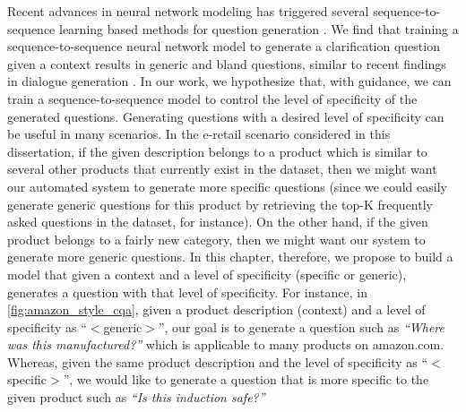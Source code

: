 \documentclass[11pt,a4paper]{article}
\begin{document}
Recent advances in neural network modeling has triggered several sequence-to-sequence learning \cite{sutskever2014sequence} based methods for question generation \cite{serban2016generating,duan2017question,du2017learning}. 
We find that training a sequence-to-sequence neural network model to generate a clarification question given a context results in generic and bland questions, similar to recent findings in dialogue generation \cite{li2016deep}.
In our work, we hypothesize that, with guidance, we can train a sequence-to-sequence model to control the level of specificity of the generated questions. 
Generating questions with a desired level of specificity can be useful in many scenarios.
In the e-retail scenario considered in this dissertation,  if the given description belongs to a product which is similar to several other products that currently exist in the dataset, then we might want our automated system to generate more specific questions (since we could easily generate generic questions for this product by retrieving the top-K frequently asked questions in the dataset, for instance).
On the other hand, if the given product belongs to a fairly new category, then we might want our system to generate more generic questions. 
In this chapter, therefore, we propose to build a model that given a context and a level of specificity (specific or generic), generates a question with that level of specificity.
For instance, in \autoref{fig:amazon_style_cqa}, given a product description (context) and a level of specificity as ``$<$generic$>$'', our goal is to generate a question such as \textit{``Where was this manufactured?''} which is applicable to many products on amazon.com. 
Whereas, given the same product description and the level of specificity as ``$<$specific$>$'', we would like to generate a question that is more specific to the given product such as \textit{``Is this induction safe?''}
\end{document}
